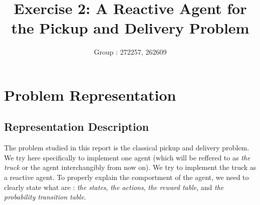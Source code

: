 \documentclass[11pt]{article}
\title{\bf Exercise 2: A Reactive Agent for the Pickup and Delivery Problem}
\author{Group \textnumero: 272257, 262609}
\begin{document}
\maketitle

\section{Problem Representation}

\subsection{Representation Description}

 	The problem studied in this report is the classical pickup and delivery problem. We try here specifically to implement one agent (which will be reffered to as \emph{the truck} or the agent interchangibly from now on). We try to implement the truck as a reactive agent. 
 	To properly explain the comportment of the agent, we need to clearly state what are : \emph{the states}, \emph{the actions}, \emph{the reward table}, and \emph{the probability transition table}.
\end{document}
